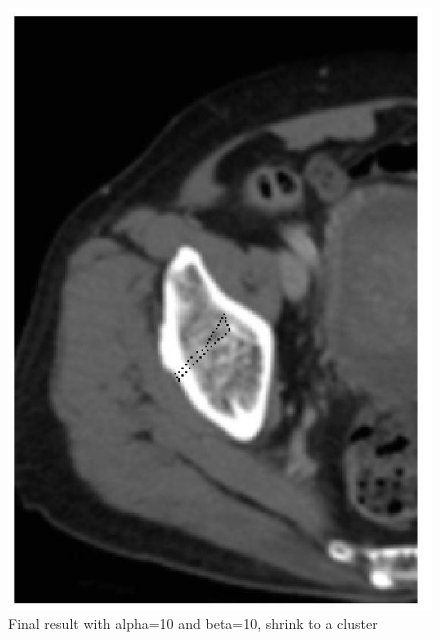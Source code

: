 \documentclass[paper=a4, fontsize=11pt]{scrartcl} %
\numberwithin{equation}{section} %
\numberwithin{figure}{section} %
\numberwithin{table}{subsection} %
\begin{document}
\begin{figure}[!htbp]
	\centering
	\includegraphics[width = 12cm]{p3_4.jpg}
	\caption{Final result with alpha=10 and beta=10, shrink to a cluster}
\end{figure}
\end{document}
